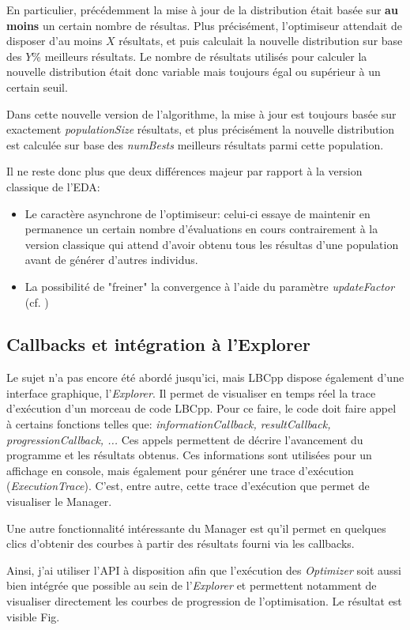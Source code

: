 \documentclass[a4paper, 11pt]{report}
\begin{document}
En particulier, précédemment la mise à jour de la distribution était basée sur \textbf{au moins} un certain nombre de résultas. Plus précisément, l'optimiseur attendait de disposer d'au moins $X$ résultats, %
et puis calculait la nouvelle distribution sur base des $Y$\% meilleurs résultats. Le nombre de résultats utilisés pour calculer la nouvelle distribution était donc variable mais toujours égal ou supérieur à un certain seuil.

Dans cette nouvelle version de l'algorithme, la mise à jour est toujours basée sur exactement \textit{populationSize} résultats, et plus précisément la nouvelle distribution est calculée sur base des \textit{numBests} meilleurs résultats parmi cette population. 

Il ne reste donc plus que deux différences majeur par rapport à la version classique de l'EDA:
\begin{itemize}
\item Le caractère asynchrone de l'optimiseur: celui-ci essaye de maintenir en permanence un certain nombre d'évaluations en cours contrairement à la version classique qui attend d'avoir obtenu tous les résultas d'une population avant de générer d'autres individus.
\item La possibilité de "freiner" la convergence à l'aide du paramètre \textit{updateFactor} (cf. ) %
\end{itemize}

\subsection{Callbacks et intégration à l'Explorer}
Le sujet n'a pas encore été abordé jusqu'ici, mais LBCpp dispose également d'une interface graphique, l'\textit{Explorer}. Il permet de visualiser en temps réel la trace d'exécution d'un morceau de code LBCpp. Pour ce faire, le code doit faire appel à certains fonctions telles que: \textit{informationCallback, resultCallback, progressionCallback, ...} Ces appels permettent de décrire l'avancement du programme et les résultats obtenus. Ces informations sont utilisées pour un affichage en console, mais également pour générer une trace d'exécution (\textit{ExecutionTrace}). C'est, entre autre, cette trace d'exécution que permet de visualiser le Manager. 

Une autre fonctionnalité intéressante du Manager est qu'il permet en quelques clics d'obtenir des courbes à partir des résultats fourni via les callbacks.

Ainsi, j'ai utiliser l'API à disposition afin que l'exécution des \textit{Optimizer} soit aussi bien intégrée que possible au sein de l'\textit{Explorer} et permettent notamment de visualiser directement les courbes de progression de l'optimisation. Le résultat est visible Fig. %
\end{document}
